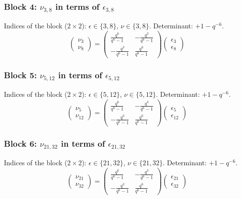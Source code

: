\subsubsection{Block 4: $\nu_{3, 8}$ in terms of $\epsilon_{3, 8}$}
Indices of the block ($2\times 2$): $\epsilon \in \{3, 8\}$, $\nu \in \{3, 8\}$.
Determinant: $+1-q^{-6}$.
\[
\begin{pmatrix}
\nu_{3} \\
\nu_{8}
\end{pmatrix}
=
\begin{pmatrix}
\frac{q^{6}}{q^{6}-1} & -\frac{q^{3}}{q^{6}-1} \\
-\frac{q^{3}}{q^{6}-1} & \frac{q^{6}}{q^{6}-1}
\end{pmatrix}
\begin{pmatrix}
\epsilon_{3} \\
\epsilon_{8}
\end{pmatrix}
\]

\subsubsection{Block 5: $\nu_{5, 12}$ in terms of $\epsilon_{5, 12}$}
Indices of the block ($2\times 2$): $\epsilon \in \{5, 12\}$, $\nu \in \{5, 12\}$.
Determinant: $+1-q^{-6}$.
\[
\begin{pmatrix}
\nu_{5} \\
\nu_{12}
\end{pmatrix}
=
\begin{pmatrix}
\frac{q^{6}}{q^{6}-1} & -\frac{q^{3}}{q^{6}-1} \\
-\frac{q^{3}}{q^{6}-1} & \frac{q^{6}}{q^{6}-1}
\end{pmatrix}
\begin{pmatrix}
\epsilon_{5} \\
\epsilon_{12}
\end{pmatrix}
\]

\subsubsection{Block 6: $\nu_{21, 32}$ in terms of $\epsilon_{21, 32}$}
Indices of the block ($2\times 2$): $\epsilon \in \{21, 32\}$, $\nu \in \{21, 32\}$.
Determinant: $+1-q^{-6}$.
\[
\begin{pmatrix}
\nu_{21} \\
\nu_{32}
\end{pmatrix}
=
\begin{pmatrix}
\frac{q^{6}}{q^{6}-1} & -\frac{q^{3}}{q^{6}-1} \\
-\frac{q^{3}}{q^{6}-1} & \frac{q^{6}}{q^{6}-1}
\end{pmatrix}
\begin{pmatrix}
\epsilon_{21} \\
\epsilon_{32}
\end{pmatrix}
\]

